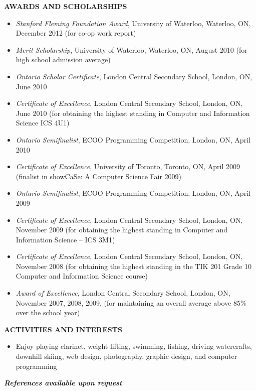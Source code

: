 \documentclass[10pt,letterpaper]{article}
\newenvironment{indentedlist}[1]%
{\begin{list}{}%
	{\setlength{\leftmargin}{#1}}%
	\item[]%
}
{\end{list}}
\begin{document}
	\vspace{0.5em}
	
	\textbf{AWARDS AND SCHOLARSHIPS}
	
	\begin{indentedlist}{2em}
			\begin{itemize}
			\item \emph{Stanford Fleming Foundation Award}, University of Waterloo, Waterloo, ON, December 2012 (for co-op work report)
			\item \emph{Merit Scholarship}, University of Waterloo, Waterloo, ON, August 2010 (for high school admission average)
			\item \emph{Ontario Scholar Certificate}, London Central Secondary School, London, ON, June 2010
			\item \emph{Certificate of Excellence}, London Central Secondary School, London, ON, June 2010 (for obtaining the highest standing in Computer and Information Science ICS 4U1)
			\item \emph{Ontario Semifinalist}, ECOO Programming Competition, London, ON, April 2010
			\item \emph{Certificate of Excellence}, University of Toronto, Toronto, ON, April 2009 (finalist in showCaSe: A Computer Science Fair 2009)
			\item \emph{Ontario Semifinalist}, ECOO Programming Competition, London, ON, April 2009
			\item \emph{Certificate of Excellence}, London Central Secondary School, London, ON, November 2009 (for obtaining the highest standing in Computer and Information Science – ICS 3M1)
			\item \emph{Certificate of Excellence}, London Central Secondary School, London, ON, November 2008 
			(for obtaining the highest standing in the TIK 201 Grade 10 Computer and Information Science course)
			\item \emph{Award of Excellence}, London Central Secondary School, London, ON, November 2007, 2008, 2009, (for maintaining an overall average above 85\% over the school year)
			\end{itemize}
	\end{indentedlist}
	
	\textbf{ACTIVITIES AND INTERESTS}
	
	\begin{indentedlist}{2em}
		\begin{itemize}
			\item Enjoy playing clarinet, weight lifting, swimming, fishing, driving watercrafts, downhill skiing, web design, photography, graphic design, and computer programming
		\end{itemize}
	\end{indentedlist}
	
	\begin{center}
		\textbf{\textit{References available upon request}}
	\end{center}
\end{document}
